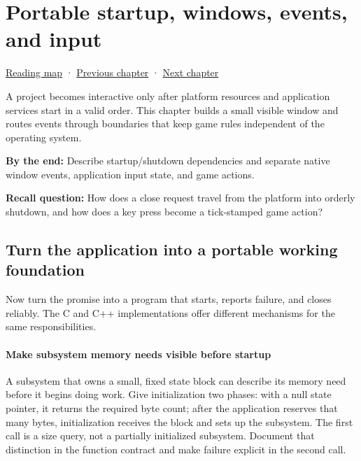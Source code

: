 \chapter{Portable startup, windows, events, and input}\label{05-engine-i-ch013-portable-startup-windows-events-and-input}\hypertarget{05-engine-i-ch013}{}\label{stagechapter:05-engine-i-ch013}

\hypertarget{05-engine-i-ch013-portable-startup-windows-events-and-input}{}

\hyperref[volume-reading-map]{Reading map} · \hyperref[04-visual-computing-ii-ch041]{Previous chapter} · \hyperref[05-engine-i-ch014-application-clocks-and-stable-input-identity]{Next chapter}

A project becomes interactive only after platform resources and application services start in a valid order. This chapter builds a small visible window and routes events through boundaries that keep game rules independent of the operating system.

\textbf{By the end:} Describe startup/shutdown dependencies and separate native window events, application input state, and game actions.

\textbf{Recall question:} How does a close request travel from the platform into orderly shutdown, and how does a key press become a tick-stamped game action?

\section{Turn the application into a portable working foundation}\label{05-engine-i-ch013-turn-the-application-into-a-portable-working-foundation}

\hypertarget{05-engine-i-ch013-turn-the-application-into-a-portable-working-foundation}{}

Now turn the promise into a program that starts, reports failure, and closes reliably. The C and C++ implementations offer different mechanisms for the same responsibilities.

\subsubsection{Make subsystem memory needs visible before startup}\label{05-engine-i-ch013-make-subsystem-memory-needs-visible-before-startup}

\hypertarget{05-engine-i-ch013-make-subsystem-memory-needs-visible-before-startup}{}

A subsystem that owns a small, fixed state block can describe its memory need before it begins doing work. Give initialization two phases: with a null state pointer, it returns the required byte count; after the application reserves that many bytes, initialization receives the block and sets up the subsystem. The first call is a size query, not a partially initialized subsystem. Document that distinction in the function contract and make failure explicit in the second call.

